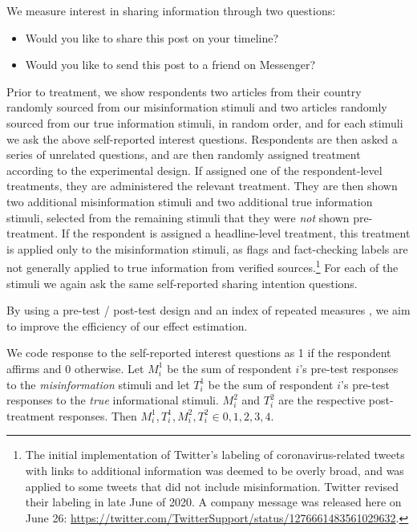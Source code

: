 \documentclass[letterpaper, 12pt, parskip=full,]{scrartcl}
\begin{document}
We measure interest in sharing information through two questions:
\begin{itemize}
\item Would you like to share this post on your timeline? 
\item Would you like to send this post to a friend on Messenger?
\end{itemize}

Prior to treatment, we show respondents two articles from their country randomly sourced from our misinformation stimuli and two articles randomly sourced from our true information stimuli, in random order, and for each stimuli we ask the above self-reported interest questions. Respondents are then asked a series of unrelated questions, and are then randomly assigned treatment according to the experimental design. If assigned one of the respondent-level treatments, they are administered the relevant treatment. They are then shown two additional misinformation stimuli and two additional true information stimuli, selected from the remaining stimuli that they were \textit{not} shown pre-treatment. If the respondent is assigned a headline-level treatment, this treatment is applied only to the misinformation stimuli, as flags and fact-checking labels are not generally applied to true information from verified sources.\footnote{The initial implementation of Twitter's labeling of coronavirus-related tweets with links to additional information was deemed to be overly broad, and was applied to some tweets that did not include misinformation. Twitter revised their labeling in late June of 2020. A company message was released here on June 26: \url{https://twitter.com/TwitterSupport/status/1276661483561029632}. } For each of the stimuli we again ask the same self-reported sharing intention questions. 

By using a pre-test / post-test design  \citep{davidian2005semiparametric} %
and an index of repeated measures \citep{broockman2017design}, we aim to improve the efficiency of our effect estimation. 


We code response to the self-reported interest questions as 1 if the respondent affirms and 0 otherwise. Let $M_i^1$ be the sum of respondent $i$'s pre-test responses to the \textit{misinformation} stimuli and let $T_i^1$ be the sum of respondent $i$'s pre-test responses to the \textit{true} informational stimuli. $M_i^2$ and $T_i^2$ are the respective post-treatment responses. Then $M_i^1, T_i^1, M_i^2, T_i^2 \in {0,1,2,3,4}$. 
\end{document}
